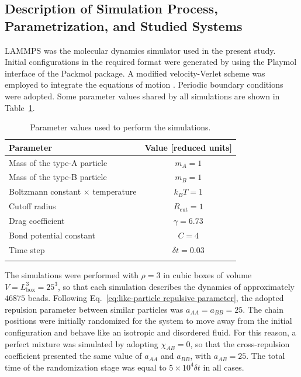 \documentclass[
aip,
jcp,
reprint,
]{revtex4-1}
\begin{document}
\subsection{Description of Simulation Process, Parametrization, and Studied Systems}




LAMMPS \cite{Plimpton_1995a} was the molecular dynamics simulator used in the present study.
Initial configurations in the required format were generated by using the Playmol\cite{Abreu_2019} interface of the Packmol\cite{Martinez_2009} package.
A modified velocity-Verlet scheme was employed to integrate the equations of motion \cite{Frenkel_2002, Allen_1989, Lemos_2020}.
Periodic boundary conditions were adopted.
Some parameter values shared by all simulations are shown in Table~\ref{table:parameters}.

\begin{table}
	\centering
	\caption{Parameter values used to perform the simulations.}
	\begin{tabular}{lc}
		\hline\hline
		Parameter & Value [reduced units] \\
		\hline
		Mass of the type-A particle & $m_A = 1$ \\
		Mass of the type-B particle & $m_B = 1$ \\
		Boltzmann constant $\times$ temperature & $k_B T = 1$ \\
		Cutoff radius & $R_\mathrm{cut} = 1$ \\
		Drag coefficient & $\gamma = 6.73$ \\
		Bond potential constant & $C = 4$ \\
		Time step & $\delta t = 0.03$ \\
		\hline\hline
		\label{table:parameters} 
	\end{tabular}
\end{table}

The simulations were performed with $\rho = 3$ in cubic boxes of volume $V = L_\mathrm{box}^3 = 25^3$, so that each simulation describes the dynamics of approximately $46875$ beads.
Following Eq.~\eqref{eq:like-particle repulsive parameter}, the adopted repulsion parameter between similar particles was $a_{AA} = a_{BB} = 25$.
The chain positions were initially randomized for the system to move away from the initial configuration and behave like an isotropic and disordered fluid.
For this reason, a perfect mixture was simulated by adopting $\chi_{AB} = 0$, so that the cross-repulsion coefficient presented the same value of $a_{AA}$ and $a_{BB}$, with $a_{AB} = 25$.
The total time of the randomization stage was equal to $5\times 10^4 \delta t$ in all cases.
\end{document}
